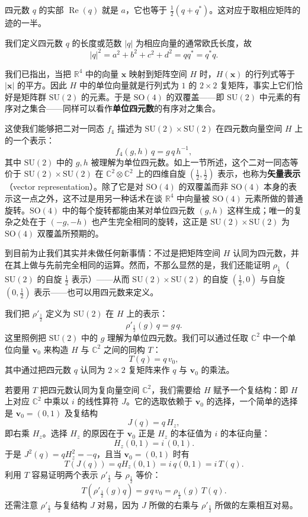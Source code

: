 四元数 $q$ 的实部 $\operatorname{Re}(q)$ 就是 $a$，它也等于 $\tfrac12(q+q^*)$。这对应于取相应矩阵的迹的一半。

我们定义四元数 $q$ 的长度或范数 $|q|$ 为相应向量的通常欧氏长度，故
\[
|q|^2=a^2+b^2+c^2+d^2=q q^*=q^* q .
\]

我们已指出，当把 $\mathbb{R}^4$ 中的向量 $\mathbf{x}$ 映射到矩阵空间 $H$ 时，$H(\mathbf{x})$ 的行列式等于 $|\mathbf{x}|$ 的平方。因此 $H$ 中的单位向量就是行列式为 $1$ 的 $2\times2$ 复矩阵，事实上它们恰好是矩阵群 $\mathrm{SU}(2)$ 的元素。于是 $\mathrm{SO}(4)$ 的双覆盖——即 $\mathrm{SU}(2)$ 中元素的有序对之集合——同样可以看作\textbf{单位四元数}的有序对之集合。

这使我们能够把二对一同态 $f_4$ 描述为 $\mathrm{SU}(2)\times\mathrm{SU}(2)$ 在四元数向量空间 $H$ 上的一个表示：
\begin{equation}
f_4(g,h)\,q=g\,q\,h^{-1}, \tag{4.2.1}
\end{equation}
其中 $\mathrm{SU}(2)$ 中的 $g,h$ 被理解为单位四元数。如上一节所述，这个二对一同态等价于 $\mathrm{SU}(2)\times\mathrm{SU}(2)$ 在 $\mathbb{C}^2\otimes\mathbb{C}^2$ 上的四维自旋 $(\tfrac12,\tfrac12)$ 表示，也称为\textbf{矢量表示}（vector representation）。除了它是对 $\mathrm{SO}(4)$ 的双覆盖而非 $\mathrm{SO}(4)$ 本身的表示这一点之外，这不过是用另一种话术在谈 $\mathbb{R}^4$ 中向量被 $\mathrm{SO}(4)$ 元素所做的普通旋转。$\mathrm{SO}(4)$ 中的每个旋转都能由某对单位四元数 $(g,h)$ 这样生成；唯一的复杂之处在于 $(-g,-h)$ 也产生完全相同的旋转，这正是 $\mathrm{SU}(2)\times\mathrm{SU}(2)$ 为 $\mathrm{SO}(4)$ 双覆盖所预期的。

到目前为止我们其实并未做任何新事情：不过是把矩阵空间 $H$ 认同为四元数，并在其上做与先前完全相同的运算。然而，不那么显然的是，我们还能证明 $\rho_{\frac12}$（$\mathrm{SU}(2)$ 的自旋 $\tfrac12$ 表示）——从而 $\mathrm{SU}(2)\times\mathrm{SU}(2)$ 的自旋 $(\tfrac12,0)$ 与自旋 $(0,\tfrac12)$ 表示——也可以用四元数来定义。

我们把 $\rho'_{\frac12}$ 定义为 $\mathrm{SU}(2)$ 在 $H$ 上的表示：
\[
\rho'_{\frac12}(g)\,q=g\,q .
\]
这里照例把 $\mathrm{SU}(2)$ 中的 $g$ 理解为单位四元数。我们可以通过任取 $\mathbb{C}^2$ 中一个单位向量 $\mathbf{v}_0$ 来构造 $H$ 与 $\mathbb{C}^2$ 之间的同构 $T$：
\[
T(q)=q\,v_0 ,
\]
其中通过把四元数 $q$ 认同为 $2\times2$ 复矩阵来作 $q$ 与 $\mathbf{v}_0$ 的乘法。

若要用 $T$ 把四元数认同为复向量空间 $\mathbb{C}^2$，我们需要给 $H$ 赋予一个复结构：即 $H$ 上对应 $\mathbb{C}^2$ 中乘以 $i$ 的线性算符 $J$。它的选取依赖于 $\mathbf{v}_0$ 的选择，一个简单的选择是 $\mathbf{v}_0=(0,1)$ 及复结构
\[
J(q)=q\,H_z ,
\]
即右乘 $H_z$。选择 $H_z$ 的原因在于 $\mathbf{v}_0$ 正是 $H_z$ 的本征值为 $i$ 的本征向量：
\[
H_z(0,1)=i\,(0,1).
\]
于是 $J^2(q)=q H_z^2=-q$，且当 $\mathbf{v}_0=(0,1)$ 时有
\[
T(J(q))=q H_z(0,1)=i\,q(0,1)=i\,T(q).
\]
利用 $T$ 容易证明两个表示 $\rho'_{\frac12}$ 与 $\rho_{\frac12}$ 等价：
\[
T(\rho'_{\frac12}(g)q)=g\,q\,v_0=\rho_{\frac12}(g)\,T(q).
\]
还需注意 $\rho'_{\frac12}$ 与复结构 $J$ 对易，因为 $J$ 所做的右乘与 $\rho'_{\frac12}$ 所做的左乘相互对易。

